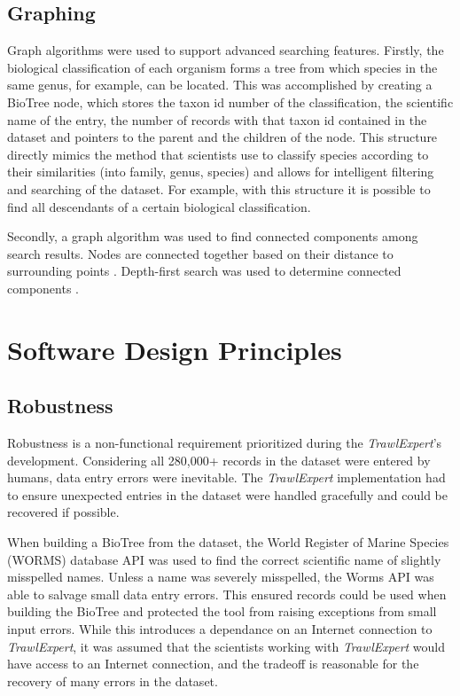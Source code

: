\documentclass{article}
\begin{document}
%
%

\subsection{Graphing}
Graph algorithms were used to support advanced searching features. Firstly, the biological classification of each organism forms a tree from which species in the same genus, for example, can be located. This was accomplished by creating a BioTree node, which stores the taxon id number of the classification, the scientific name of the entry, the number of records with that taxon id contained in the dataset and pointers to the parent and the children of the node. This structure directly mimics the method that scientists use to classify species according to their similarities (into family, genus, species) and allows for intelligent filtering and searching of the dataset. For example, with this structure it is possible to find all descendants of a certain biological classification.

Secondly, a graph algorithm was used to find connected components among search results. Nodes are connected together based on their distance to surrounding points \citep{tom10}. Depth-first search was used to determine connected components \citep{broder2000graph}.

\section{Software Design Principles}
\subsection{Robustness}
Robustness is a non-functional requirement prioritized during the \textit{TrawlExpert}'s development. Considering all 280,000+ records in the dataset were entered by humans, data entry errors were inevitable. The \textit{TrawlExpert} implementation had to ensure unexpected entries in the dataset were handled gracefully and could be recovered if possible. 

When building a BioTree from the dataset, the World Register of Marine Species (WORMS) database API was used to find the correct scientific name of slightly misspelled names. Unless a name was severely misspelled, the Worms API was able to salvage small data entry errors. This ensured records could be used when building the BioTree and protected the tool from raising exceptions from small input errors. While this introduces a dependance on an Internet connection to \textit{TrawlExpert}, it was assumed that the scientists working with \textit{TrawlExpert} would have access to an Internet connection, and the tradeoff is reasonable for the recovery of many errors in the dataset.
\end{document}
